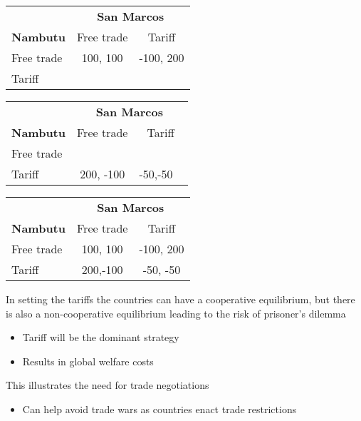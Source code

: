 \documentclass{beamer}
\begin{document}
\begin{frame}
  \begin{table}
    \begin{tabular}{lcc}
    ~ &\multicolumn{2}{c}{\textbf{San Marcos}}\\
    \textbf{Nambutu}  & Free trade & Tariff\\
    Free trade  & 100, 100  & -100, 200\\
    Tariff  & ~ & ~\\      
    \end{tabular}
  \end{table}
\end{frame}

\begin{frame}
  \begin{table}
    \begin{tabular}{lcc}
    ~ &\multicolumn{2}{c}{\textbf{San Marcos}}\\
    \textbf{Nambutu}  & Free trade & Tariff\\
    Free trade  & ~ & ~\\
    Tariff  & 200, -100 & -50,-50 ~\\      
    \end{tabular}
  \end{table}
\end{frame}

\begin{frame}
  \begin{table}
    \begin{tabular}{lcc}
    ~ &\multicolumn{2}{c}{\textbf{San Marcos}}\\
    \textbf{Nambutu}  & Free trade & Tariff\\
    Free trade  & 100, 100  & -100, 200\\
    Tariff  & 200,-100 & -50, -50\\      
    \end{tabular}
  \end{table}
\end{frame}

\begin{frame}
  In setting the tariffs the countries can have a cooperative equilibrium, but there is also a non-cooperative equilibrium leading to the risk of prisoner's dilemma
  \begin{itemize}
    \item Tariff will be the dominant strategy
    \item Results in global welfare costs
  \end{itemize}
  \medskip
  This illustrates the need for trade negotiations
  \begin{itemize}
    \item Can help avoid trade wars as countries enact trade restrictions
  \end{itemize}
\end{frame}
\end{document}
